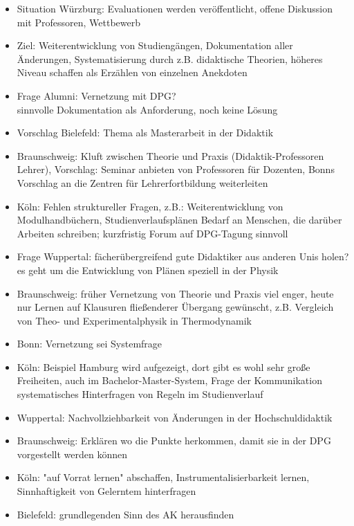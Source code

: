 \begin{itemize}
        \item Situation Würzburg: Evaluationen werden veröffentlicht, offene Diskussion mit Professoren, Wettbewerb
        \item Ziel: Weiterentwicklung von Studiengängen, Dokumentation aller Änderungen, Systematisierung durch z.B. didaktische Theorien, höheres Niveau schaffen als Erzählen von einzelnen Anekdoten
        \item Frage Alumni: Vernetzung mit DPG? \\
          \rightarrow sinnvolle Dokumentation als Anforderung, noch keine Lösung
        \item Vorschlag Bielefeld: Thema als Masterarbeit in der Didaktik
        \item Braunschweig: Kluft zwischen Theorie und Praxis (Didaktik-Professoren \leftrightarrow Lehrer), Vorschlag: Seminar anbieten von Professoren für Dozenten, Bonns Vorschlag an die Zentren für Lehrerfortbildung weiterleiten
        \item Köln: Fehlen struktureller Fragen, z.B.: Weiterentwicklung von Modulhandbüchern, Studienverlaufsplänen \rightarrow Bedarf an Menschen, die darüber Arbeiten schreiben; kurzfristig Forum auf DPG-Tagung sinnvoll
        \item Frage Wuppertal: fächerübergreifend gute Didaktiker aus anderen Unis holen? \\
          \rightarrow es geht um die Entwicklung von Plänen speziell in der Physik
        \item Braunschweig: früher Vernetzung von Theorie und Praxis viel enger, heute nur Lernen auf Klausuren \rightarrow fließenderer Übergang gewünscht, z.B. Vergleich von Theo- und Experimentalphysik in Thermodynamik
        \item Bonn: Vernetzung sei Systemfrage
        \item Köln: Beispiel Hamburg wird aufgezeigt, dort gibt es wohl sehr große Freiheiten, auch im Bachelor-Master-System, Frage der Kommunikation \rightarrow systematisches Hinterfragen von Regeln im Studienverlauf
        \item Wuppertal: Nachvollziehbarkeit von Änderungen in der Hochschuldidaktik
        \item Braunschweig: Erklären wo die Punkte herkommen, damit sie in der DPG vorgestellt werden können
        \item Köln: "auf Vorrat lernen" abschaffen, Instrumentalisierbarkeit lernen, Sinnhaftigkeit von Gelerntem hinterfragen
        \item Bielefeld: grundlegenden Sinn des AK herausfinden

\end{itemize}
